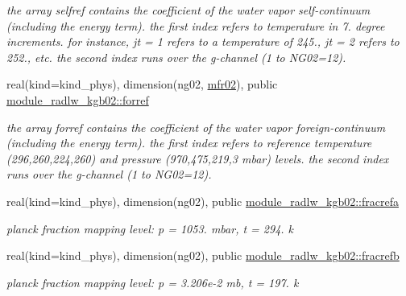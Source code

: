 \begin{DoxyCompactItemize}
\begin{DoxyCompactList}\small\item\em the array selfref contains the coefficient of the water vapor self-\/continuum (including the energy term). the first index refers to temperature in 7. degree increments. for instance, jt = 1 refers to a temperature of 245., jt = 2 refers to 252., etc. the second index runs over the g-\/channel (1 to N\+G02=12). \end{DoxyCompactList}\item 
\mbox{\label{group__module__radlw__kgbnn_gaf6f3d7a0ab6858eab9d4d3e2d2d68031}} 
real(kind=kind\+\_\+phys), dimension(ng02, \hyperlink{group__module__radlw__kgbnn_ga2973c2e9220e85b74f0b251c896aa837}{mfr02}), public \hyperlink{group__module__radlw__kgbnn_gaf6f3d7a0ab6858eab9d4d3e2d2d68031}{module\+\_\+radlw\+\_\+kgb02\+::forref}
\begin{DoxyCompactList}\small\item\em the array forref contains the coefficient of the water vapor foreign-\/continuum (including the energy term). the first index refers to reference temperature (296,260,224,260) and pressure (970,475,219,3 mbar) levels. the second index runs over the g-\/channel (1 to N\+G02=12). \end{DoxyCompactList}\item 
\mbox{\label{group__module__radlw__kgbnn_gaf6db1580bd4a8b037cdd3e14765e2c83}} 
real(kind=kind\+\_\+phys), dimension(ng02), public \hyperlink{group__module__radlw__kgbnn_gaf6db1580bd4a8b037cdd3e14765e2c83}{module\+\_\+radlw\+\_\+kgb02\+::fracrefa}
\begin{DoxyCompactList}\small\item\em planck fraction mapping level\+: p = 1053. mbar, t = 294. k \end{DoxyCompactList}\item 
\mbox{\label{group__module__radlw__kgbnn_gaeedda30c8d2bd7c9e7124c6445c8c20e}} 
real(kind=kind\+\_\+phys), dimension(ng02), public \hyperlink{group__module__radlw__kgbnn_gaeedda30c8d2bd7c9e7124c6445c8c20e}{module\+\_\+radlw\+\_\+kgb02\+::fracrefb}
\begin{DoxyCompactList}\small\item\em planck fraction mapping level\+: p = 3.\+206e-\/2 mb, t = 197. k \end{DoxyCompactList}\item 

\end{DoxyCompactItemize}
